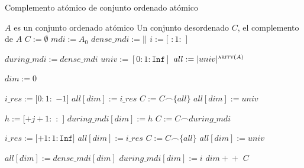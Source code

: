 \begin{algorithm}
\caption{Complemento atómico de conjunto ordenado atómico}
\label{alg:ComplementAtomDes}
\begin{algorithmic}[1]
\Require $A$ es un conjunto ordenado atómico
\Ensure Un conjunto desordenado $C$, el complemento de $A$
  \State $C := \emptyset$  
  \State $mdi := A_0$  
  \State $dense\_mdi := ||$
    \State $i := $$[$ $:1:$ $]$
    \State {}
  \EndFor

  \State $during\_mdi := dense\_mdi$
  \State $univ := [0:1:\texttt{Inf}]$
  \State $all := |univ|^{\Call{arity}{A}}$ 

  \State $dim := 0$

      \State $i\_res := [0:1:$ $-1]$
        \State $all[dim] := i\_res$
        \State $C := C \frown \{all\}$
        \State $all[dim] := univ$
      \EndIf
    \EndIf

            \State $h := [$$ + j + 1 : $ $: $ $]$
              \State $during\_mdi[dim] := h$
              \State $C := C \frown during\_mdi$
            \EndIf
          \EndFor
        \EndIf
    \EndIf

      \State $i\_res := [$$+1 : 1 : \texttt{Inf}]$
        \State $all[dim] := i\_res$
        \State $C := C \frown \{all\}$
        \State $all[dim] := univ$
      \EndIf
    \EndIf

    \State $all[dim] := dense\_mdi[dim]$
    \State $during\_mdi[dim] := i$
    \State $dim \!+\!+$
  \EndFor
  \State \Return $C$
\EndFunction
\end{algorithmic}
\end{algorithm}


